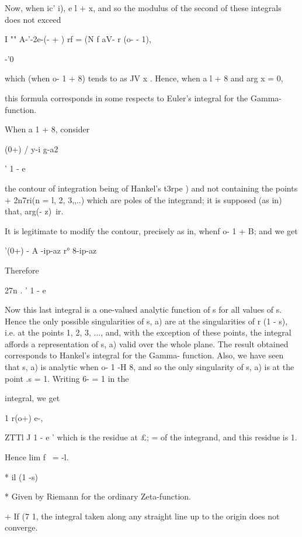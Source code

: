 %
%

Now, when ic' i), e l + x, and so the modulus of the second of these
integrals does not exceed

I "" A-'-2e-(- + ) rf = (N f aV- r (o- - 1),

-'0

which (when o- 1 + 8) tends to as JV x . Hence, when a l + 8 and arg x
= 0,

this formula corresponds in some respects to Euler's integral for the
Gamma- function.

When a 1 + 8,
consider

(0+) / y-i g-a2

' 1 - e

the contour of integration being of Hankel's t3rpe ) and not
containing the points + 2n7ri(n = l, 2, 3,,..) which are poles of the
integrand; it is supposed (as in) that, arg(- z)\ ir.

It is legitimate to modify the contour, precisely as in, whenf
o- 1 + B; and we get

'(0+) - A -ip-az r° 8-ip-az

Therefore

27n . ' 1 - e

Now this last integral is a one-valued analytic function of s for all
values of s. Hence the only possible singularities of s, a) are at the
singularities of r (1 - s), i.e. at the points 1, 2, 3, ..., and, with
the exception of these points, the integral affords a representation
of s, a) valid over the whole plane. The result obtained corresponds
to Hankel's integral for the Gamma- function. Also, we have seen that
s, a) is analytic when o- 1 -H 8, and so the only singularity of s, a)
is at the point .s = 1. Writing 6- = 1 in the

integral, we get

1 r(o+) e-,

ZTTl J 1 - e ' which is the residue at £; = of the integrand, and this
residue is 1.

Hence lim f \ = -l.

* il (1 -s)

* Given by Riemann for the ordinary Zeta-function.

+ If (7 1, the integral taken along any straight line up to the origin
does not converge.

%
%

